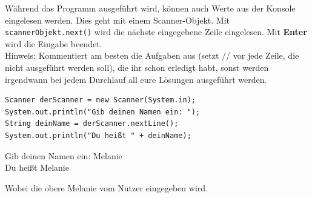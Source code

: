\documentclass{../../sheet}
\begin{document}
\newpage
{}
Während das Programm ausgeführt wird, können auch Werte aus der Konsole eingelesen werden. Dies geht mit einem Scanner-Objekt. Mit \texttt{scannerObjekt.next()} wird die nächste eingegebene Zeile eingelesen. Mit \textbf{Enter} wird die Eingabe beendet.\\
Hinweis: Kommentiert am besten die Aufgaben aus (setzt // vor jede Zeile, die nicht ausgeführt werden soll), die ihr schon erledigt habt, sonst werden irgendwann bei jedem Durchlauf all eure Lösungen ausgeführt werden.
\begin{verbatim}
Scanner derScanner = new Scanner(System.in);
System.out.println("Gib deinen Namen ein: ");
String deinName = derScanner.nextLine();
System.out.println("Du heißt " + deinName);
\end{verbatim}
\begin{ausgabe}
	Gib deinen Namen ein: Melanie\\
	Du heißt Melanie
\end{ausgabe}
Wobei die obere Melanie vom Nutzer eingegeben wird.
\end{document}
